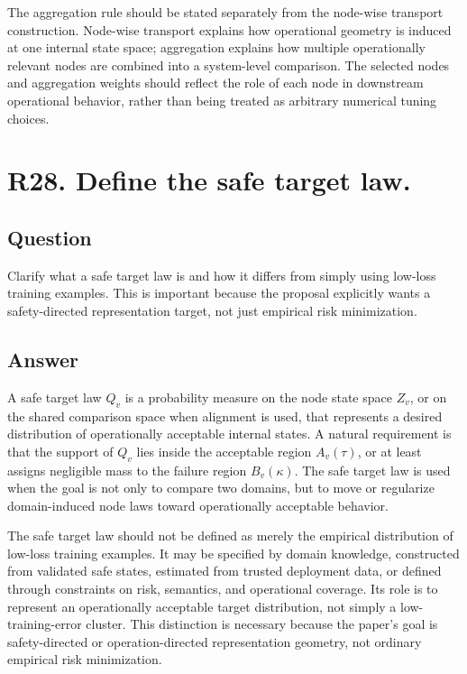 \documentclass[11pt,a4paper]{article}
\begin{document}
The aggregation rule should be stated separately from the node-wise transport construction. Node-wise transport explains how operational geometry is induced at one internal state space; aggregation explains how multiple operationally relevant nodes are combined into a system-level comparison. The selected nodes and aggregation weights should reflect the role of each node in downstream operational behavior, rather than being treated as arbitrary numerical tuning choices.

\section*{R28. Define the safe target law.}

\subsection*{Question}

Clarify what a safe target law is and how it differs from simply using low-loss training examples. This is important because the proposal explicitly wants a safety-directed representation target, not just empirical risk minimization.

\subsection*{Answer}

A safe target law \(Q_v\) is a probability measure on the node state space \(Z_v\), or on the shared comparison space when alignment is used, that represents a desired distribution of operationally acceptable internal states. A natural requirement is that the support of \(Q_v\) lies inside the acceptable region \(A_v(\tau)\), or at least assigns negligible mass to the failure region \(B_v(\kappa)\). The safe target law is used when the goal is not only to compare two domains, but to move or regularize domain-induced node laws toward operationally acceptable behavior.

The safe target law should not be defined as merely the empirical distribution of low-loss training examples. It may be specified by domain knowledge, constructed from validated safe states, estimated from trusted deployment data, or defined through constraints on risk, semantics, and operational coverage. Its role is to represent an operationally acceptable target distribution, not simply a low-training-error cluster. This distinction is necessary because the paper's goal is safety-directed or operation-directed representation geometry, not ordinary empirical risk minimization.
\end{document}
